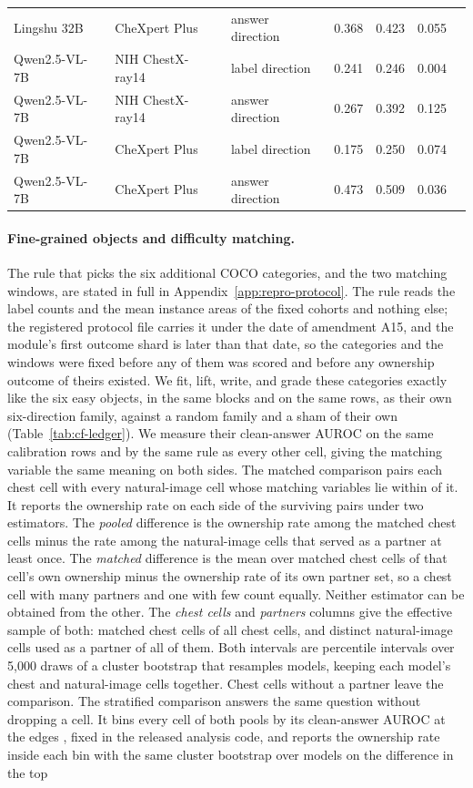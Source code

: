 \documentclass{article}
\begin{document}
\begin{table}[htbp]
\begin{tabular}{lllcccc}
Lingshu 32B & CheXpert Plus & answer direction & 0.368 & 0.423 & 0.055 & \\
Qwen2.5-VL-7B & NIH ChestX-ray14 & label direction & 0.241 & 0.246 & 0.004 & \\
Qwen2.5-VL-7B & NIH ChestX-ray14 & answer direction & 0.267 & 0.392 & 0.125 & \\
Qwen2.5-VL-7B & CheXpert Plus & label direction & 0.175 & 0.250 & 0.074 & \\
Qwen2.5-VL-7B & CheXpert Plus & answer direction & 0.473 & 0.509 & 0.036 & \\
\bottomrule
\end{tabular}
\end{table}

\paragraph{Fine-grained objects and difficulty matching.} The rule that picks the six additional COCO categories, and the two matching windows, are stated in full in Appendix~\ref{app:repro-protocol}. The rule reads the label counts and the mean instance areas of the fixed cohorts and nothing else; the registered protocol file carries it under the date of amendment A15, and the module's first outcome shard is later than that date, so the categories and the windows were fixed before any of them was scored and before any ownership outcome of theirs existed. We fit, lift, write, and grade these categories exactly like the six easy objects, in the same blocks and on the same rows, as their own six-direction family, against a random family and a sham of their own (Table~\ref{tab:cf-ledger}). We measure their clean-answer AUROC on the same calibration rows and by the same rule as every other cell, giving the matching variable the same meaning on both sides. The matched comparison pairs each chest cell with every natural-image cell whose matching variables lie within \cfFgWindow{} of it. It reports the ownership rate on each side of the surviving pairs under two estimators. The \emph{pooled} difference is the ownership rate among the matched chest cells minus the rate among the natural-image cells that served as a partner at least once. The \emph{matched} difference is the mean over matched chest cells of that cell's own ownership minus the ownership rate of its own partner set, so a chest cell with many partners and one with few count equally. Neither estimator can be obtained from the other. The \emph{chest cells} and \emph{partners} columns give the effective sample of both: matched chest cells of all chest cells, and distinct natural-image cells used as a partner of all of them. Both intervals are percentile intervals over 5{,}000 draws of a cluster bootstrap that resamples models, keeping each model's chest and natural-image cells together. Chest cells without a partner leave the comparison. The stratified comparison answers the same question without dropping a cell. It bins every cell of both pools by its clean-answer AUROC at the edges \cfStratEdges{}, fixed in the released analysis code, and reports the ownership rate inside each bin with the same cluster bootstrap over models on the difference in the top 
\end{document}
